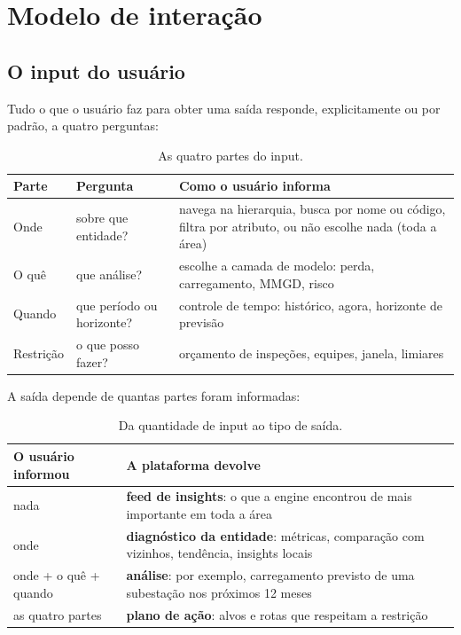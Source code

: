 \documentclass[11pt,a4paper]{article}
\begin{document}
\section{Modelo de interação}

\subsection{O input do usuário}

Tudo o que o usuário faz para obter uma saída responde, explicitamente ou por
padrão, a quatro perguntas:

\begin{table}[H]
\centering
\begin{tabularx}{\textwidth}{l l L}
\toprule
\textbf{Parte} & \textbf{Pergunta} & \textbf{Como o usuário informa} \\
\midrule
Onde & sobre que entidade? & navega na hierarquia, busca por nome ou
  código, filtra por atributo, ou não escolhe nada (toda a área) \\
O quê & que análise? & escolhe a camada de modelo: perda, carregamento,
  MMGD, risco \\
Quando & que período ou horizonte? & controle de tempo: histórico, agora,
  horizonte de previsão \\
Restrição & o que posso fazer? & orçamento de inspeções, equipes, janela,
  limiares \\
\bottomrule
\end{tabularx}
\caption{As quatro partes do input.}
\end{table}

A saída depende de quantas partes foram informadas:

\begin{table}[H]
\centering
\begin{tabularx}{\textwidth}{l L}
\toprule
\textbf{O usuário informou} & \textbf{A plataforma devolve} \\
\midrule
nada & \textbf{feed de insights}: o que a engine encontrou de mais
  importante em toda a área \\
onde & \textbf{diagnóstico da entidade}: métricas, comparação com vizinhos,
  tendência, insights locais \\
onde + o quê + quando & \textbf{análise}: por exemplo, carregamento previsto
  de uma subestação nos próximos 12 meses \\
as quatro partes & \textbf{plano de ação}: alvos e rotas que respeitam a
  restrição \\
\bottomrule
\end{tabularx}
\caption{Da quantidade de input ao tipo de saída.}
\end{table}
\end{document}
